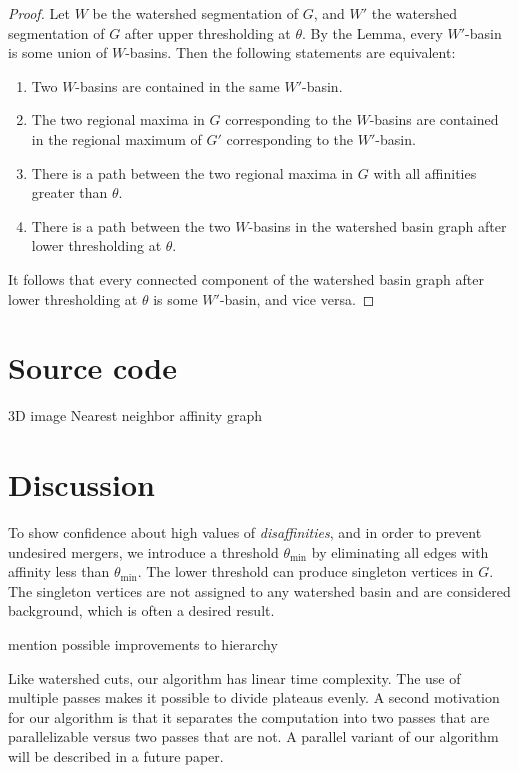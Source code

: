 \documentclass{article}
\begin{document}
\begin{proof}
Let $W$ be the watershed segmentation of $G$, and $W'$ the watershed
segmentation of $G$ after upper thresholding at $\theta$.  By the
Lemma, every $W'$-basin is some union of $W$-basins.  Then the
following statements are equivalent:
\begin{enumerate}
\item Two $W$-basins are contained in the same $W'$-basin.
\item The two regional maxima in $G$ corresponding to the $W$-basins
  are contained in the regional maximum of $G'$ corresponding to the
  $W'$-basin.
\item There is a path between the two regional maxima in $G$ with
  all affinities greater than $\theta$.
\item There is a path between the two $W$-basins in the watershed
  basin graph after lower thresholding at $\theta$.
\end{enumerate}
It follows that every connected component of the watershed basin graph
after lower thresholding at $\theta$ is some $W'$-basin, and vice versa. 
\end{proof}

\section{Source code}
3D image
Nearest neighbor affinity graph 

\section{Discussion}
To show confidence about high values of \emph{disaffinities}, and in
order to prevent undesired mergers, we introduce a threshold
$\theta_{\min}$ by eliminating all edges with affinity less than
$\theta_{\min}$. The lower threshold can produce singleton vertices in
$G$. The singleton vertices are not assigned to any watershed basin
and are considered background, which is often a desired result.

mention possible improvements to hierarchy

Like watershed cuts, our algorithm has linear time complexity.  The
use of multiple passes makes it possible to divide plateaus evenly.  A
second motivation for our algorithm is that it separates the
computation into two passes that are parallelizable versus two passes
that are not.  A parallel variant of our algorithm will be described
in a future paper.





{\small


}
\end{document}
